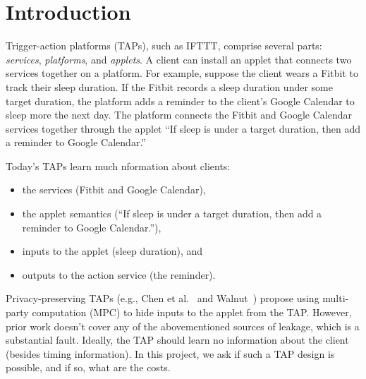 \section{Introduction}
\label{sec:intro}

Trigger-action platforms (TAPs), such as IFTTT, comprise several parts:
\emph{services}, \emph{platforms}, and \emph{applets}. A client can install an
applet that connects two services together on a platform. For example, suppose
the client wears a Fitbit to track their sleep duration. If the Fitbit records a
sleep duration under some target duration, the platform adds a reminder to
the client's Google Calendar to sleep more the next day. The platform connects
the Fitbit and Google Calendar services together through the applet ``If sleep
is under a target duration, then add a reminder to Google Calendar.'' 

Today's TAPs learn much nformation about clients:
\begin{itemize}[leftmargin=*]
  \item the services (Fitbit and Google Calendar),
  \item the applet semantics (``If sleep is under a target duration, then add a
    reminder to Google Calendar.''),
  \item inputs to the applet (sleep duration), and
  \item outputs to the action service (the reminder).
\end{itemize}

Privacy-preserving TAPs (e.g., Chen et al.~\cite{DBLP:conf/sp/ChenCWSCF21} and
Walnut~\cite{DBLP:journals/corr/abs-2009-12447}) propose using multi-party
computation (MPC) to hide inputs to the applet from the TAP. However, prior work
doesn't cover any of the abovementioned sources of leakage, which is a substantial fault. Ideally,
the TAP should learn no information about the client (besides timing
information). In this project, we ask if such a TAP design is possible, and if
so, what are the costs. 
